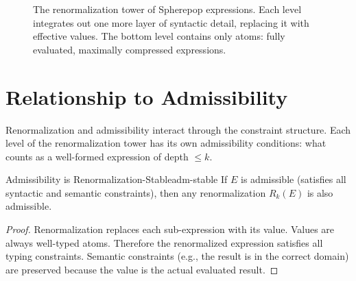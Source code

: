 \begin{figure}[h]
  \centering
  \caption{The renormalization tower of Spherepop expressions.
    Each level integrates out one more layer of syntactic detail,
    replacing it with effective values. The bottom level contains
    only atoms: fully evaluated, maximally compressed expressions.}
  \label{fig:renorm-tower}
\end{figure}

\section{Relationship to Admissibility}

Renormalization and admissibility interact through the constraint structure.
Each level of the renormalization tower has its own admissibility conditions:
what counts as a well-formed expression of depth $\leq k$.

\begin{proposition}{Admissibility is Renormalization-Stable}{adm-stable}
  If $E$ is admissible (satisfies all syntactic and semantic constraints),
  then any renormalization $R_k(E)$ is also admissible.
\end{proposition}

\begin{proof}
  Renormalization replaces each sub-expression with its value.
  Values are always well-typed atoms. Therefore the renormalized
  expression satisfies all typing constraints. Semantic constraints
  (e.g., the result is in the correct domain) are preserved because
  the value is the actual evaluated result.
\end{proof}

